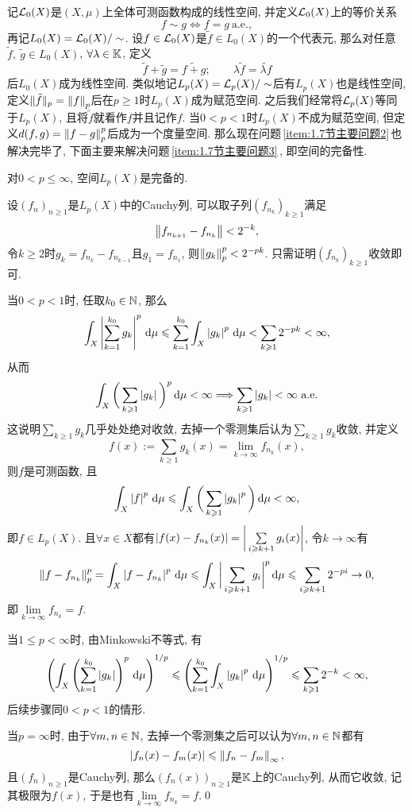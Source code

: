 记$ \mathcal{L}_0(X) $是$ (X,\mu) $上全体可测函数构成的线性空间, 并定义$ \mathcal{L}_0(X) $上的等价关系
\[
	f\sim g\Longleftrightarrow f=g\ \text{a.e.},
\]
再记$ L_0(X)=\mathcal{L}_0(X)/\sim $. 设$ f\in\mathcal{L}_0(X) $是$ \tilde{f}\in L_0(X) $的一个代表元, 那么对任意$ \tilde{f},\ \tilde{g}\in L_0(X) $, $ \forall \lambda\in\mathbb{K} $, 定义
\[
	\tilde{f}+\tilde{g}=\widetilde{f+g};\qquad \lambda\tilde{f}=\widetilde{\lambda f}
\]
后$ L_0(X) $成为线性空间. 类似地记$ L_p(X)=\mathcal{L}_p(X)/\sim $后有$ L_p(X) $也是线性空间, 定义$ \lVert\tilde f\rVert_p=\left\| f \right\|_p $后在$ p\geqslant 1 $时$ L_p(X) $成为赋范空间. 之后我们经常将$ \mathcal{L}_p(X) $等同于$ L_p(X) $, 且将$ \tilde{f} $就看作$ f $并且记作$ f $. 当$ 0<p<1 $时$ L_p(X) $不成为赋范空间, 但定义$ d(f,g)=\left\| f-g \right\|_p^p $后成为一个度量空间. 那么现在问题\,\ref{item:1.7节主要问题2}\,也解决完毕了, 下面主要来解决问题\,\ref{item:1.7节主要问题3}\,, 即空间的完备性.

\begin{Theorem}
	对$ 0<p\leqslant\infty $, 空间$ L_p(X) $是完备的.
\end{Theorem}
\begin{Proof}
	设$ (f_n)_{n\geqslant 1} $是$ L_p(X) $中的Cauchy列, 可以取子列$ (f_{n_k})_{k\geqslant 1} $满足
	\[
		\left\| f_{n_{k+1}}-f_{n_k} \right\|<2^{-k},
	\]
	令$ k\geqslant 2 $时$ g_k=f_{n_k}-f_{n_{k-1}} $且$ g_1=f_{n_1} $, 则$ \left\| g_k \right\|_p^p<2^{-pk} $. 只需证明$ (f_{n_k})_{k\geqslant 1} $收敛即可.

	当$ 0<p<1 $时, 任取$ k_0\in\mathbb{N} $, 那么
	\[
		\int_X\left| \sum_{k=1}^{k_0}g_k \right| ^p\,\mathrm{d}\mu\leqslant\sum_{k=1}^{k_0}\int_X\left| g_k \right| ^p\,\mathrm{d}\mu<\sum_{k\geqslant 1}2^{-pk}<\infty,
	\]
	从而
	\[
		\int_X\bigg(\sum_{k\geqslant 1}\left| g_k \right| \bigg)^p\,\mathrm{d}\mu<\infty\Longrightarrow\sum_{k\geqslant 1}\left| g_k \right| <\infty\ \text{a.e.}
	\]
	这说明$ \sum\limits_{k\geqslant 1}g_k $几乎处处绝对收敛, 去掉一个零测集后认为$ \sum\limits_{k\geqslant 1}g_{k} $收敛, 并定义
	\[
		f(x):=\sum_{k\geqslant 1}g_k(x)=\lim_{k\to\infty}f_{n_k}(x),
	\]
	则$ f $是可测函数, 且
	\[
		\int_X\left| f \right| ^p\,\mathrm{d}\mu\leqslant\int_X\bigg(\sum_{k\geqslant 1}\left| g_k \right| ^p\bigg)\,\mathrm{d} \mu<\infty,
	\]
	即$ f\in L_p(X) $. 且$ \forall x\in X $都有$ \left| f(x)-f_{n_k}(x) \right| =\bigg|\sum\limits_{i\geqslant k+1}g_i(x)\bigg| $, 令$ k\to\infty $有
	\[
		\left\| f-f_{n_k} \right\|_p^p=\int_X\left| f-f_{n_k} \right| ^p\,\mathrm{d}\mu\leqslant\int_X\bigg|\sum_{i\geqslant k+1}g_i\bigg|^p\,\mathrm{d}\mu\leqslant\sum_{i\geqslant k+1}2^{-pi}\to 0,
	\]
	即$ \lim\limits_{k\to\infty}f_{n_{k}}=f $.

	当$ 1\leqslant p<\infty $时, 由Minkowski不等式, 有
	\[
		\left( \int_X\left( \sum_{k=1}^{k_0}\left| g_k \right|  \right)^p\,\mathrm{d}\mu \right)^{1/p}\leqslant\left( \sum_{k=1}^{k_0}\int_X\left| g_k \right| ^p\,\mathrm{d}\mu \right)^{1/p}\leqslant\sum_{k\geqslant 1}2^{-k}<\infty,
	\]
	后续步骤同$ 0<p<1 $的情形.

	当$ p=\infty $时, 由于$ \forall m,n\in\mathbb{N} $, 去掉一个零测集之后可以认为$ \forall m,n\in\mathbb{N} $都有
	\[
		\left| f_n(x)-f_m(x) \right| \leqslant\left\| f_n-f_m \right\|_\infty,
	\]
	且$ (f_n)_{n\geqslant 1} $是Cauchy列, 那么$ (f_n(x))_{n\geqslant 1} $是$ \mathbb{K} $上的Cauchy列, 从而它收敛, 记其极限为$ f(x) $, 于是也有$ \lim\limits_{k\to\infty}f_{n_k}=f $.\qed
\end{Proof}


